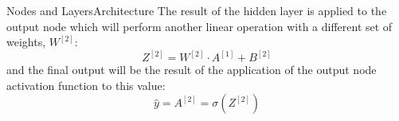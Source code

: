 \documentclass[aspectratio=169]{beamer}
\begin{document}
%
%
\begin{frame}{Nodes and Layers}{Architecture}
The result of the hidden layer is applied to the output node which will perform another linear operation with a different set of weights, $W^{[2]}$:
$$ Z^{[2]} = W^{[2]} \cdot A^{[1]} + B^{[2]} $$
and the final output will be the result of the application of the output node activation function to this value:
$$ \hat{y}  = A^{[2]}= \sigma\left({Z^{[2]}}\right)$$
\end{frame}
%
%
%
\end{document}
